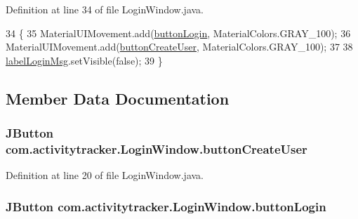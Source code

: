Definition at line 34 of file Login\+Window.\+java.


\begin{DoxyCode}
34                            \{
35         MaterialUIMovement.add(\hyperlink{classcom_1_1activitytracker_1_1_login_window_ac77d9f8f3a6c697a9847ecd130ac2ef6}{buttonLogin}, MaterialColors.GRAY\_100);
36         MaterialUIMovement.add(\hyperlink{classcom_1_1activitytracker_1_1_login_window_a1ff77d6846d01d4a8540371ede091371}{buttonCreateUser}, MaterialColors.GRAY\_100);
37 
38         \hyperlink{classcom_1_1activitytracker_1_1_login_window_a567ae49b39c07840b39eec92fdf92c22}{labelLoginMsg}.setVisible(\textcolor{keyword}{false});
39     \}
\end{DoxyCode}


\subsection{Member Data Documentation}
\subsubsection[{\texorpdfstring{button\+Create\+User}{buttonCreateUser}}]{\setlength{\rightskip}{0pt plus 5cm}J\+Button com.\+activitytracker.\+Login\+Window.\+button\+Create\+User\hspace{0.3cm}{\ttfamily [private]}}\hypertarget{classcom_1_1activitytracker_1_1_login_window_a1ff77d6846d01d4a8540371ede091371}{}\label{classcom_1_1activitytracker_1_1_login_window_a1ff77d6846d01d4a8540371ede091371}


Definition at line 20 of file Login\+Window.\+java.

\subsubsection[{\texorpdfstring{button\+Login}{buttonLogin}}]{\setlength{\rightskip}{0pt plus 5cm}J\+Button com.\+activitytracker.\+Login\+Window.\+button\+Login\hspace{0.3cm}{\ttfamily [private]}}\hypertarget{classcom_1_1activitytracker_1_1_login_window_ac77d9f8f3a6c697a9847ecd130ac2ef6}{}\label{classcom_1_1activitytracker_1_1_login_window_ac77d9f8f3a6c697a9847ecd130ac2ef6}


